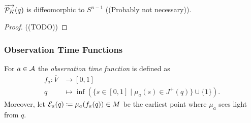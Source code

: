 \begin{proposition}
$\overrightarrow{\mathcal{P}_K}(q)$ is diffeomorphic to $S^{n-1}$ ((Probably not necessary)).
\end{proposition}
\begin{proof}
((TODO))
\end{proof}

\subsubsection{Observation Time Functions}
\begin{definition}\label{def:observationtime}
For $a\in \mathcal{A}$ the \emph{observation time function} 
is defined as 
\begin{align*}
    f_a:\overline{V}&\to [0,1]\\
    q&\mapsto\inf(\{s\in [0,1] \mid \mu_a(s)\in J^+(q)\}\cup \{1\}).
\end{align*}
Moreover, let $\mathcal{E}_a(q)\coloneqq\mu_a(f_a(q))\in M$ be the earliest point where $\mu_a$ sees light from $q$.
\end{definition}

